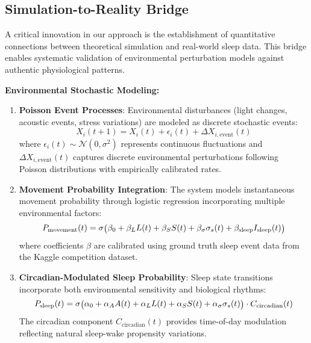 \documentclass[conference]{IEEEtran}
\begin{document}
\subsection{Simulation-to-Reality Bridge}
A critical innovation in our approach is the establishment of quantitative connections between theoretical simulation and real-world sleep data. This bridge enables systematic validation of environmental perturbation models against authentic physiological patterns.

\textbf{Environmental Stochastic Modeling:}
\begin{enumerate}
    \item \textbf{Poisson Event Processes}: Environmental disturbances (light changes, acoustic events, stress variations) are modeled as discrete stochastic events:
    {\scriptsize
    \begin{equation}
    X_i(t+1) = X_i(t) + \epsilon_i(t) + \Delta X_{i,\text{event}}(t)
    \end{equation}
    }
    where $\epsilon_i(t) \sim \mathcal{N}(0, \sigma^2)$ represents continuous fluctuations and $\Delta X_{i,\text{event}}(t)$ captures discrete environmental perturbations following Poisson distributions with empirically calibrated rates.
    
    \item \textbf{Movement Probability Integration}: The system models instantaneous movement probability through logistic regression incorporating multiple environmental factors:
    \begin{equation}
        \scriptsize
    P_{\text{movement}}(t) = \sigma\big( \beta_0 + \beta_L L(t) + \beta_S S(t) + \beta_\sigma \sigma_s(t) + \beta_{\text{sleep}} I_{\text{sleep}}(t) \big)
    \end{equation}
    where coefficients $\beta$ are calibrated using ground truth sleep event data from the Kaggle competition dataset.
    
    \item \textbf{Circadian-Modulated Sleep Probability}: Sleep state transitions incorporate both environmental sensitivity and biological rhythms:
    \begin{equation}
        \scriptsize
    P_{\text{sleep}}(t) = \sigma\big( \alpha_0 + \alpha_A A(t) + \alpha_L L(t) + \alpha_S S(t) + \alpha_\sigma \sigma_s(t) \big) \cdot C_{\text{circadian}}(t)
    \end{equation}
    The circadian component $C_{\text{circadian}}(t)$ provides time-of-day modulation reflecting natural sleep-wake propensity variations.
\end{enumerate}
\end{document}
